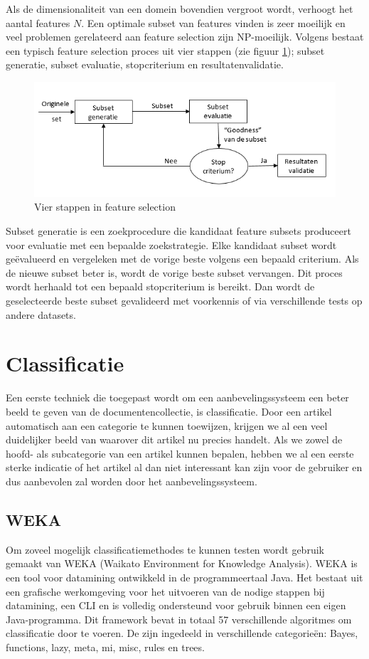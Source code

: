 Als de dimensionaliteit van een domein bovendien vergroot wordt, verhoogt het aantal features $N$. Een optimale subset van features vinden is zeer moeilijk en veel problemen gerelateerd aan feature selection zijn NP-moeilijk. Volgens \cite{Liu2005} bestaat een typisch feature selection proces uit vier stappen (zie figuur \ref{fig:feature-selection}); subset generatie, subset evaluatie, stopcriterium en resultatenvalidatie.

\begin{figure}[h]
	\caption{Vier stappen in feature selection}
	\label{fig:feature-selection}
	\includegraphics[width=\textwidth]{fig/feature-selection}
\end{figure}

Subset generatie is een zoekprocedure die kandidaat feature subsets produceert voor evaluatie met een bepaalde zoekstrategie. Elke kandidaat subset wordt ge\"evalueerd en vergeleken met de vorige beste volgens een bepaald criterium. Als de nieuwe subset beter is, wordt de vorige beste subset vervangen. Dit proces wordt herhaald tot een bepaald stopcriterium is bereikt. Dan wordt de geselecteerde beste subset gevalideerd met voorkennis of via verschillende tests op andere datasets. 

\section{Classificatie}
Een eerste techniek die toegepast wordt om een aanbevelingssysteem een beter beeld te geven van de documentencollectie, is classificatie. Door een artikel automatisch aan een categorie te kunnen toewijzen, krijgen we al een veel duidelijker beeld van waarover dit artikel nu precies handelt. Als we zowel de hoofd- als subcategorie van een artikel kunnen bepalen, hebben we al een eerste sterke indicatie of het artikel al dan niet interessant kan zijn voor de gebruiker en dus aanbevolen zal worden door het aanbevelingssysteem.

\subsection{WEKA}
Om zoveel mogelijk classificatiemethodes te kunnen testen wordt gebruik gemaakt van WEKA \cite{weka} (Waikato Environment for Knowledge Analysis). WEKA is een tool voor datamining ontwikkeld in de programmeertaal Java. Het bestaat uit een grafische werkomgeving  voor het uitvoeren van de nodige stappen bij datamining, een CLI en is volledig ondersteund voor gebruik binnen een eigen Java-programma. Dit framework bevat in totaal 57 verschillende algoritmes om classificatie door te voeren. De zijn ingedeeld in verschillende categorie\"en: Bayes, functions, lazy, meta, mi, misc, rules en trees.

